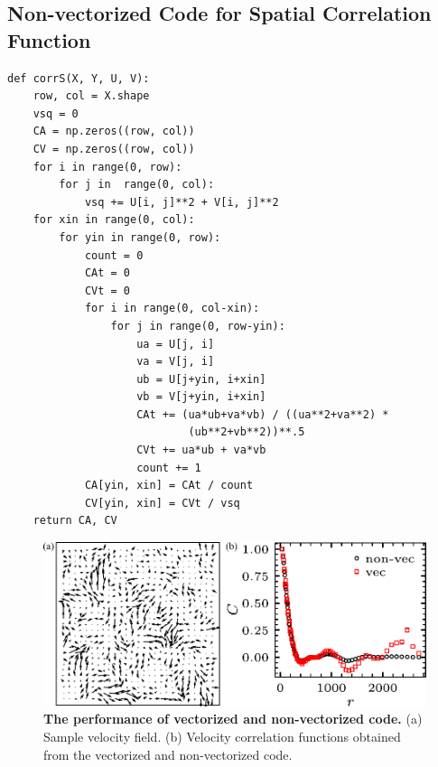 \subsection{Non-vectorized Code for Spatial Correlation Function}
\begin{verbatim}
def corrS(X, Y, U, V):
    row, col = X.shape
    vsq = 0
    CA = np.zeros((row, col))
    CV = np.zeros((row, col))
    for i in range(0, row):
        for j in  range(0, col):
            vsq += U[i, j]**2 + V[i, j]**2
    for xin in range(0, col):
        for yin in range(0, row):
            count = 0
            CAt = 0
            CVt = 0
            for i in range(0, col-xin):
                for j in range(0, row-yin):
                    ua = U[j, i]
                    va = V[j, i]
                    ub = U[j+yin, i+xin]
                    vb = V[j+yin, i+xin]
                    CAt += (ua*ub+va*vb) / ((ua**2+va**2) *
                            (ub**2+vb**2))**.5
                    CVt += ua*ub + va*vb
                    count += 1
            CA[yin, xin] = CAt / count
            CV[yin, xin] = CVt / vsq
    return CA, CV
\end{verbatim}


\begin{figure}[!ht]
	\begin{center}
	\includegraphics[width=5.5in]{Figs/A-2/vectorization.pdf}
	\end{center}
	\caption[The Performance of Vectorized and Non-vectorized Code]
	{
	\textbf{The performance of vectorized and non-vectorized code.}
  (a) Sample velocity field.
  (b) Velocity correlation functions obtained from the vectorized and non-vectorized code.
	}
	\label{fig:vectorization-performance}
\end{figure}


